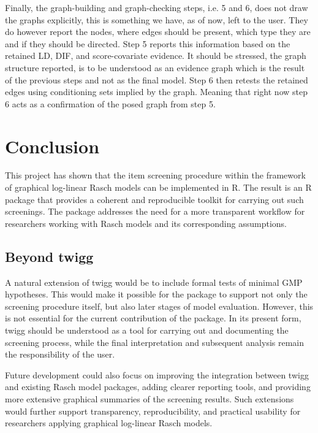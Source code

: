 \documentclass[a4project,12pt]{article}
\theoremstyle{examplestyle}
\theoremstyle{defstyle}
\theoremstyle{thmstyle}
\begin{document}
Finally, the graph-building and graph-checking steps, i.e. 5 and 6, does not draw the graphs explicitly, this is something we have, as of now, left to the user. They do however report the nodes, where edges should be present, which type they are and if they should be directed. Step 5 reports this information based on the retained LD, DIF, and score-covariate evidence. It should be stressed, the graph structure reported, is to be understood as an evidence graph which is the result of the previous steps and not as the final model. Step 6 then retests the retained edges using conditioning sets implied by the graph. Meaning that right now step 6 acts as a confirmation of the posed graph from step 5. 

\section{Conclusion}
This project has shown that the item screening procedure within the framework of graphical log-linear Rasch models can be implemented in R. The result is an R package that provides a coherent and reproducible toolkit for carrying out such screenings. The package addresses the need for a more transparent workflow for researchers working with Rasch models and its corresponding assumptions. 

\subsection{Beyond twigg}
A natural extension of twigg would be to include formal tests of minimal GMP hypotheses. This would make it possible for the package to support not only the screening procedure itself, but also later stages of model evaluation. However, this is not essential for the current contribution of the package. In its present form, twigg should be understood as a tool for carrying out and documenting the screening process, while the final interpretation and subsequent analysis remain the responsibility of the user.

Future development could also focus on improving the integration between twigg and existing Rasch model packages, adding clearer reporting tools, and providing more extensive graphical summaries of the screening results. Such extensions would further support transparency, reproducibility, and practical usability for researchers applying graphical log-linear Rasch models.


\newpage


\newpage
\begin{appendices}
\section{}\label{sec:App1}

\end{appendices}

\begin{appendices}
\section{}\label{sec:AppB}

\end{appendices}
\end{document}
